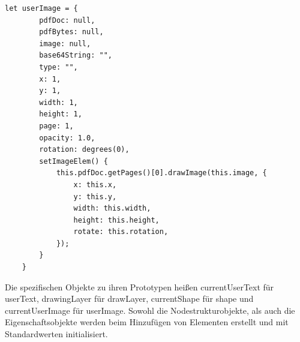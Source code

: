 \begin{lstlisting}[style=ES6, caption={Prototyp-Objekt für die imagespezifischen Eigenschaften}, label=code:user-image, breaklines=true]
	let userImage = {
		pdfDoc: null,
		pdfBytes: null,
		image: null,
		base64String: "",
		type: "",
		x: 1,
		y: 1,
		width: 1,
		height: 1,
		page: 1,
		opacity: 1.0,
		rotation: degrees(0),
		setImageElem() {
			this.pdfDoc.getPages()[0].drawImage(this.image, {
				x: this.x,
				y: this.y,
				width: this.width,
				height: this.height,
				rotate: this.rotation,
			});
		}
	}
\end{lstlisting}

Die spezifischen Objekte zu ihren Prototypen heißen currentUserText für userText, drawingLayer für drawLayer, currentShape für shape und currentUserImage für userImage. Sowohl die Nodestrukturobjekte, als auch die Eigenschaftsobjekte werden beim Hinzufügen von Elementen erstellt und mit Standardwerten initialisiert. 

